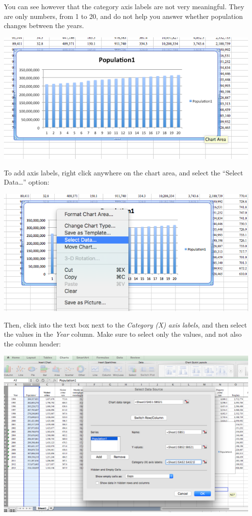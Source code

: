 \documentclass[
]{book}
\begin{document}
You can see however that the category axis labels are not very meaningful. They are only numbers, from 1 to 20, and do not help you answer whether population changes between the years.

\includegraphics{imgs/pop_blue.png}

To add axis labels, right click anywhere on the chart area, and select the ``Select Data\ldots{}'' option:

\includegraphics{imgs/pb2.png}

Then, click into the text box next to the \emph{Category (X) axis labels}, and then select the values in the \emph{Year} column. Make sure to select only the values, and not also the column header:

\includegraphics{imgs/pb3.png}
\end{document}
